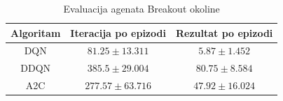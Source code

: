 \begin{table}[H]
    \centering
    \caption{Evaluacija agenata Breakout okoline}
    \begin{tabular}{c c c}
        \toprule
        Algoritam & Iteracija po epizodi & Rezultat po epizodi  \\
        \midrule
        DQN & $81.25 \pm 13.311$ & $5.87 \pm 1.452$ \\
        DDQN & $385.5 \pm 29.004$ & $80.75 \pm 8.584$ \\
        A2C & $277.57 \pm 63.716$ & $47.92 \pm 16.024$ \\
        \bottomrule
    \end{tabular}
    \label{table:breakout-eval}
\end{table}
